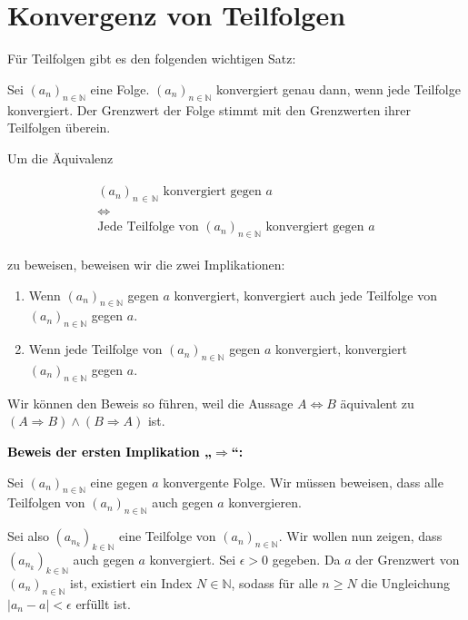 \documentclass[fontsize=9pt,
               parskip=half-,
               DIV=14,
               listof=chapterentry,
               tocflat]{scrbook}
\newenvironment{indentblock}{\begin{adjustwidth}{.5cm}{}}{\end{adjustwidth}}
\newcommand{\proofstep}[1]{\textbf{\textcolor{Black}{#1}}}
\begin{document}
\section{Konvergenz von Teilfolgen}

Für Teilfolgen gibt es den folgenden wichtigen Satz:

\begin{theorem*}
Sei $(a_{n})_{n\in \mathbb {N} }$ eine Folge. $(a_{n})_{n\in \mathbb {N} }$ konvergiert genau dann, wenn jede Teilfolge konvergiert. Der Grenzwert der Folge stimmt mit den Grenzwerten ihrer Teilfolgen überein.

\end{theorem*}

\begin{proof*}
Um die Äquivalenz

\begin{align*}
{\begin{array}{c}(a_{n})_{n\,\in \,\mathbb {N} }{\text{ konvergiert gegen }}a\\[1ex]\Leftrightarrow \\[1ex]{\text{Jede Teilfolge von }}(a_{n})_{n\in \mathbb {N} }{\text{ konvergiert gegen }}a\end{array}}
\end{align*}

zu beweisen, beweisen wir die zwei Implikationen:

\begin{enumerate}
\item Wenn $(a_{n})_{n\in \mathbb {N} }$ gegen $a$ konvergiert, konvergiert auch jede Teilfolge von $(a_{n})_{n\in \mathbb {N} }$ gegen $a$.
\item Wenn jede Teilfolge von $(a_{n})_{n\in \mathbb {N} }$ gegen $a$ konvergiert, konvergiert $(a_{n})_{n\in \mathbb {N} }$ gegen $a$.
\end{enumerate}

Wir können den Beweis so führen, weil die Aussage $A\Leftrightarrow B$ äquivalent zu $(A\Rightarrow B)\land (B\Rightarrow A)$ ist.

\proofstep{Beweis der ersten Implikation „$\Rightarrow $“:}
 \begin{indentblock}
Sei $(a_{n})_{n\in \mathbb {N} }$ eine gegen $a$ konvergente Folge. Wir müssen beweisen, dass alle Teilfolgen von $(a_{n})_{n\in \mathbb {N} }$ auch gegen $a$ konvergieren.

Sei also $\left(a_{n_{k}}\right)_{k\in \mathbb {N} }$ eine Teilfolge von $(a_{n})_{n\in \mathbb {N} }$. Wir wollen nun zeigen, dass $\left(a_{n_{k}}\right)_{k\in \mathbb {N} }$ auch gegen $a$ konvergiert. Sei $\epsilon >0$ gegeben. Da $a$ der Grenzwert von $(a_{n})_{n\in \mathbb {N} }$ ist, existiert ein Index $N\in \mathbb {N} $, sodass für alle $n\geq N$ die Ungleichung $|a_{n}-a|<\epsilon $ erfüllt ist.


\end{indentblock}
\end{proof*}
\end{document}
